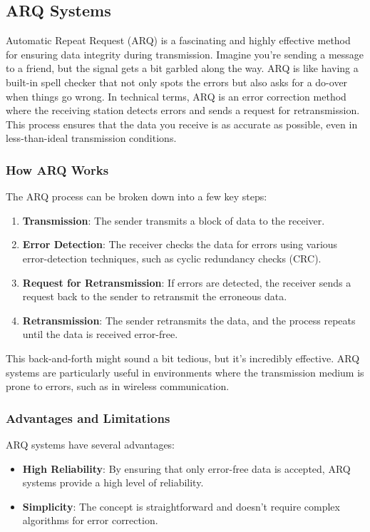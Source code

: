 \subsection{ARQ Systems}
\label{subsec:arq-systems}

Automatic Repeat Request (ARQ) is a fascinating and highly effective method for ensuring data integrity during transmission. Imagine you're sending a message to a friend, but the signal gets a bit garbled along the way. ARQ is like having a built-in spell checker that not only spots the errors but also asks for a do-over when things go wrong. In technical terms, ARQ is an error correction method where the receiving station detects errors and sends a request for retransmission. This process ensures that the data you receive is as accurate as possible, even in less-than-ideal transmission conditions.

\subsubsection*{How ARQ Works}
The ARQ process can be broken down into a few key steps:
\begin{enumerate}
    \item \textbf{Transmission}: The sender transmits a block of data to the receiver.
    \item \textbf{Error Detection}: The receiver checks the data for errors using various error-detection techniques, such as cyclic redundancy checks (CRC).
    \item \textbf{Request for Retransmission}: If errors are detected, the receiver sends a request back to the sender to retransmit the erroneous data.
    \item \textbf{Retransmission}: The sender retransmits the data, and the process repeats until the data is received error-free.
\end{enumerate}

This back-and-forth might sound a bit tedious, but it's incredibly effective. ARQ systems are particularly useful in environments where the transmission medium is prone to errors, such as in wireless communication.

\subsubsection*{Advantages and Limitations}
ARQ systems have several advantages:
\begin{itemize}[noitemsep]    \item \textbf{High Reliability}: By ensuring that only error-free data is accepted, ARQ systems provide a high level of reliability.
    \item \textbf{Simplicity}: The concept is straightforward and doesn't require complex algorithms for error correction.
\end{itemize}

